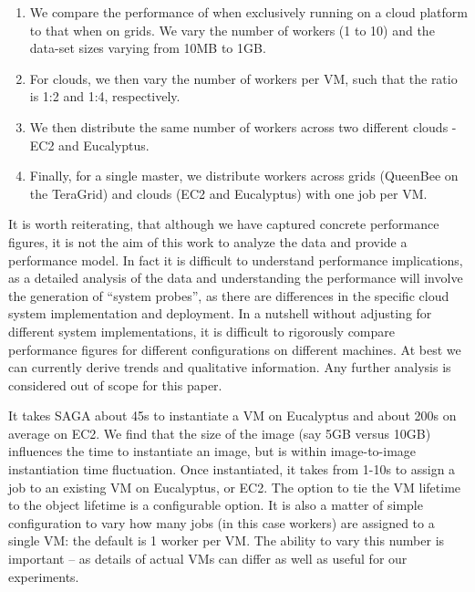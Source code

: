 \documentclass[3p,twocolumn]{elsarticle}
\begin{document}
\begin{enumerate}

 \item We compare the performance of \sagamapreduce when exclusively
 running on a cloud platform to that when on grids. We vary the number
 of workers (1 to 10) and the data-set sizes varying from 10MB to 1GB.

 \item For clouds, we then vary the number of workers per VM, such
 that the ratio is 1:2 and 1:4, respectively.

 \item We then distribute the same number of workers across two
 different clouds - EC2 and Eucalyptus.

 \item Finally, for a single master, we distribute workers across
 grids (QueenBee on the TeraGrid) and clouds (EC2 and Eucalyptus) with
 one job per VM.

\end{enumerate}

It is worth reiterating, that although we have captured concrete
performance figures, it is not the aim of this work to analyze the
data and provide a performance model. In fact it is difficult to
understand performance implications, as a detailed analysis of the
data and understanding the performance will involve the generation of
``system probes'', as there are differences in the specific cloud
system implementation and deployment.  In a nutshell without adjusting
for different system implementations, it is difficult to rigorously
compare performance figures for different configurations on different
machines. At best we can currently derive trends and qualitative
information.  Any further analysis is considered out of scope for this
paper.

It takes SAGA about 45s to instantiate a VM on Eucalyptus and about
200s on average on EC2.  We find that the size of the image (say 5GB
versus 10GB) influences the time to instantiate an image, but is
within image-to-image instantiation time fluctuation.  Once
instantiated, it takes from 1-10s to assign a job to an existing VM on
Eucalyptus, or EC2.  The option to tie the VM lifetime to the
 object lifetime is a configurable option.  It
is also a matter of simple configuration to vary how many jobs (in
this case workers) are assigned to a single VM:  the default is 1
worker per VM.  The ability to vary this number is important -- as
details of actual VMs can differ as well as useful for our
experiments.
\end{document}
